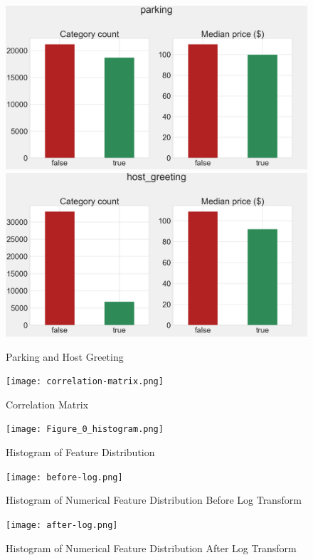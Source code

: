 \begin{figure}[H]
\centering
    \caption{Parking and Host Greeting}
    \includegraphics[width=\linewidth]{figures/amenities/group3/parking.png}
    \vspace{0.5cm}
    \includegraphics[width=\linewidth]{figures/amenities/group3/host_greetings.png}
    \label{fig:parking-and-host-greeting}
\end{figure}


\begin{figure}[H] \centering
\texttt{[image: correlation-matrix.png]}
\caption{Correlation Matrix}
\label{fig:correlation-matrix}
\end{figure}

\begin{figure}[H] \centering
\caption{Histogram of Feature Distribution}
\texttt{[image: Figure\_0\_histogram.png]}
\label{fig:histogram-feature-distribution}
\end{figure}

\begin{figure}[H] \centering
\caption{Histogram of Numerical Feature Distribution Before Log Transform }
\texttt{[image: before-log.png]}
\label{fig:histogram-before-transform}
\end{figure}

\begin{figure}[H] \centering
\caption{Histogram of Numerical Feature Distribution After Log Transform }
\texttt{[image: after-log.png]}
\label{fig:histogram-after-transform}
\end{figure}
